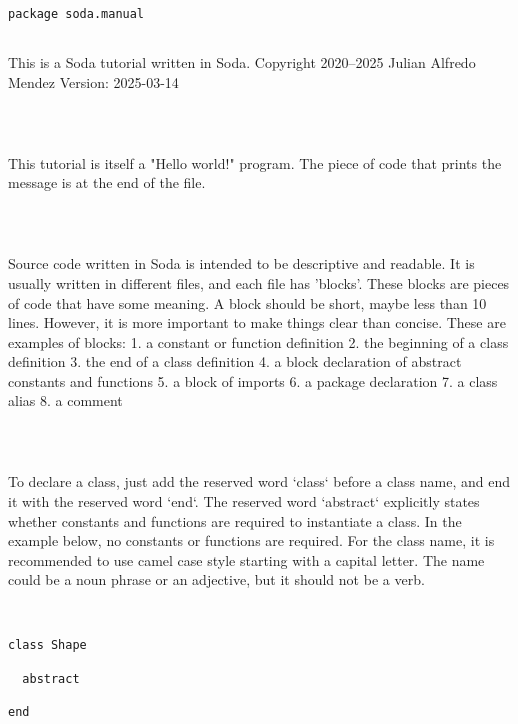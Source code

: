 \documentclass[12pt,a4paper]{article}
\begin{document}
\begin{lstlisting}
package soda.manual


\end{lstlisting}

This is a Soda tutorial written in Soda.
Copyright 2020--2025 Julian Alfredo Mendez
Version: 2025-03-14


\begin{lstlisting}



\end{lstlisting}

This tutorial is itself a "Hello world!" program.
The piece of code that prints the message is at the end of the file.


\begin{lstlisting}



\end{lstlisting}

Source code written in Soda is intended to be descriptive and readable.
It is usually written in different files, and each file has 'blocks'.
These blocks are pieces of code that have some meaning.
A block should be short, maybe less than 10 lines.
However, it is more important to make things clear than concise.
These are examples of blocks:
1. a constant or function definition
2. the beginning of a class definition
3. the end of a class definition
4. a block declaration of abstract constants and functions
5. a block of imports
6. a package declaration
7. a class alias
8. a comment


\begin{lstlisting}



\end{lstlisting}

To declare a class, just add the reserved word `class` before a class name, and end it with
the reserved word `end`.
The reserved word `abstract` explicitly states whether constants and functions are required
to instantiate a class. In the example below, no constants or functions are required.
For the class name, it is recommended to use camel case style starting with a capital letter.
The name could be a noun phrase or an adjective, but it should not be a verb.


\begin{lstlisting}


class Shape

  abstract

end


\end{lstlisting}
\end{document}
